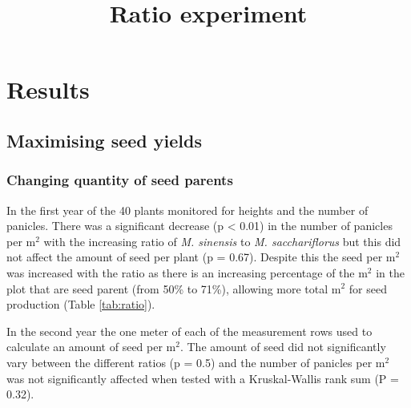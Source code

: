\documentclass[fleqn, 15pt, lineno]{olplainarticle}
\begin{document}
\FloatBarrier
\section{Results}

\FloatBarrier
\subsection{Maximising seed yields}

\FloatBarrier
\subsubsection{Changing quantity of seed parents}
\title{Ratio experiment}

In the first year of the 40 plants monitored for heights and the number of panicles.
There was a significant decrease (p < 0.01) in the number of panicles per m$^2$ with the increasing ratio of \textit{M. sinensis} to \textit{M. sacchariflorus} but this did not affect the amount of seed per plant (p = 0.67).
Despite this the seed per m$^2$ was increased with the ratio as there is an increasing percentage of the m$^2$ in the plot that are seed parent (from 50\% to 71\%), allowing more total m$^2$ for seed production (Table \ref{tab:ratio}).

In the second year the one meter of each of the measurement rows used to calculate an amount of seed per m$^2$.
The amount of seed did not significantly vary between the different ratios (p = 0.5) and the number of panicles per m$^2$ was not significantly affected when tested with a Kruskal-Wallis rank sum (P = 0.32).
\end{document}
